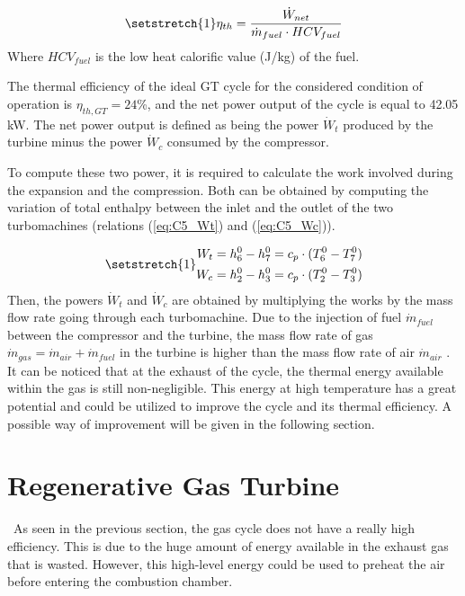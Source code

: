\begin{equation}
    \setstretch{1}
    \eta_{th} = \frac{\dot{W}_{net}}{\dot{m}_{fuel}\cdot HCV_{fuel}} \label{eq:C5_etath}
\end{equation}
Where $HCV_{fuel}$ is the low heat calorific value (J/kg) of the fuel.

The thermal efficiency of the ideal GT cycle for the considered condition of operation is $\eta_{th,GT} =24$\%, and the net power output of the cycle is equal to 42.05 kW. The net power output is defined as being the power $\dot{W}_t$ produced by the turbine minus the power $\dot{W}_c$ consumed by the compressor.

To compute these two power, it is required to calculate the work involved during the expansion and the compression. Both can be obtained by computing the variation of total enthalpy between the inlet and the outlet of the two turbomachines (relations (\ref{eq:C5_Wt}) and (\ref{eq:C5_Wc})).

\begin{subequations}
\setstretch{1}
\begin{align}
    W_t = h^0_6 - h^0_7 = c_p\cdot(T^0_6 - T^0_7)\label{eq:C5_Wt}\\
    W_c = h^0_2 - h^0_3 = c_p\cdot(T^0_2 - T^0_3)\label{eq:C5_Wc}
\end{align}
\end{subequations}
Then, the powers $\dot{W}_t$ and $\dot{W}_c$ are obtained by multiplying the works by the mass flow rate going through each turbomachine. Due to the injection of fuel $\dot{m}_{fuel}$ between the compressor and the turbine, the mass flow rate of gas $\dot{m}_{gas}=\dot{m}_{air}+\dot{m}_{fuel}$ in the turbine is higher than the mass flow rate of air $\dot{m}_{air}$ .\\


It can be noticed that at the exhaust of the cycle, the thermal energy available within the gas is still non-negligible. This energy at high temperature has a great potential and could be utilized to improve the cycle and its thermal efficiency. A possible way of improvement will be given in the following section.\newpage

\section{Regenerative Gas Turbine}
\quad\, As seen in the previous section, the gas cycle does not have a really high efficiency. This is due to the huge amount of energy available in the exhaust gas that is wasted. However, this high-level energy could be used to preheat the air before entering the combustion chamber. 

